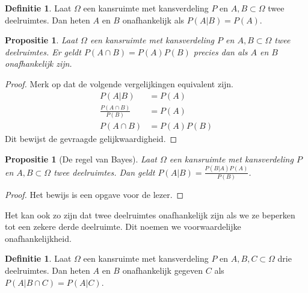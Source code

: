 \documentclass[a4paper]{book}
\newtheorem{proposition}[theorem]{Propositie}
\theoremstyle{definition}
\newtheorem{definition}[theorem]{Definitie}
\begin{document}
\begin{definition}
    Laat $\Omega$ een kansruimte met kansverdeling $P$ en $A,B \subset \Omega$ twee deelruimtes.
    Dan heten $A$ en $B$ onafhankelijk als $P(A|B) = P(A)$.
\end{definition}

\begin{proposition}
    Laat $\Omega$ een kansruimte met kansverdeling $P$ en $A,B \subset \Omega$ twee deelruimtes.
    Er geldt $P(A \cap B) = P(A)P(B)$ precies dan als $A$ en $B$ onafhankelijk zijn.
\end{proposition}
\begin{proof}
    Merk op dat de volgende vergelijkingen equivalent zijn.
    \begin{align*}
        P(A|B)                      &= P(A) \\
        \frac{P(A \cap B)}{P(B)}    &= P(A) \\
        P(A \cap B)                 &= P(A)P(B)
    \end{align*}
    Dit bewijst de gevraagde gelijkwaardigheid.
\end{proof}

\begin{proposition}[De regel van Bayes]
    Laat $\Omega$ een kansruimte met kansverdeling $P$ en $A,B \subset \Omega$ twee deelruimtes.
    Dan geldt $P(A|B) = \frac{P(B|A)P(A)}{P(B)}$.
\end{proposition}
\begin{proof}
    Het bewijs is een opgave voor de lezer.
\end{proof}

Het kan ook zo zijn dat twee deelruimtes onafhankelijk zijn als we ze beperken tot een zekere derde deelruimte.
Dit noemen we voorwaardelijke onafhankelijkheid.
\begin{definition}
    Laat $\Omega$ een kansruimte met kansverdeling $P$ en $A,B,C \subset \Omega$ drie deelruimtes.
    Dan heten $A$ en $B$ onafhankelijk gegeven $C$ als $P(A|B \cap C) = P(A|C)$.
\end{definition}
\end{document}
